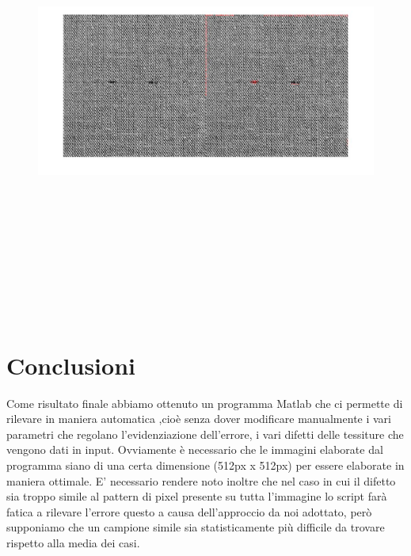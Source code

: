 \documentclass[a4paper]{article}
\begin{document}
    \begin{figure}[H]
        \centering
        \includegraphics[width=15cm,height=15cm,keepaspectratio]{risultato_finale.jpg}
    \end{figure}

    
\vspace{0.5cm}
\section{Conclusioni}
\setlength{\baselineskip}{0.8cm}
    {\vspace{0.5cm}\fontsize{6mm}{6mm}\selectfont Come risultato finale abbiamo ottenuto un programma Matlab che ci permette di rilevare in maniera automatica ,cioè senza dover modificare manualmente i vari parametri che regolano l'evidenziazione dell'errore, i vari difetti delle tessiture che vengono dati in input. Ovviamente è necessario che le immagini elaborate dal programma siano di una certa dimensione (512px x 512px) per essere elaborate in maniera ottimale. E' necessario rendere noto inoltre che nel caso in cui il difetto sia troppo simile al pattern di pixel presente su tutta l'immagine lo script farà fatica a rilevare l'errore questo a causa dell'approccio da noi adottato, però supponiamo che un campione simile sia statisticamente più difficile da trovare rispetto alla media dei casi. }
\end{document}
